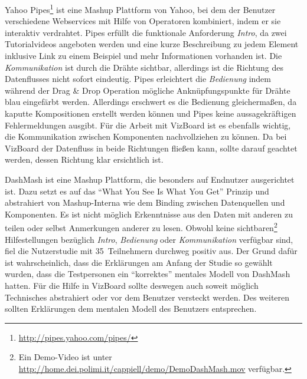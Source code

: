 \documentclass[
	headsepline,
	footsepline,
	fontsize=12pt,
	bibliography=totoc
]{scrbook}
\begin{document}
Yahoo Pipes\footnote{\url{http://pipes.yahoo.com/pipes/}} ist eine Mashup Plattform von Yahoo, bei dem der Benutzer verschiedene Webservices mit Hilfe von Operatoren kombiniert, indem er sie interaktiv verdrahtet.
Pipes erfüllt die funktionale Anforderung \emph{Intro}, da zwei Tutorialvideos angeboten werden und eine kurze Beschreibung zu jedem Element inklusive Link zu einem Beispiel und mehr Informationen vorhanden ist. Die \emph{Kommunikation} ist durch die Drähte sichtbar, allerdings ist die Richtung des Datenflusses nicht sofort eindeutig. Pipes erleichtert die \emph{Bedienung} indem während der Drag \& Drop Operation mögliche Anknüpfungspunkte für Drähte blau eingefärbt werden.
Allerdings erschwert es die Bedienung gleichermaßen, da kaputte Kompositionen erstellt werden können und Pipes keine aussagekräftigen Fehlermeldungen ausgibt.
Für die Arbeit mit VizBoard ist es ebenfalls wichtig, die Kommunikation zwischen Komponenten nachvollziehen zu können. Da bei VizBoard der Datenfluss in beide Richtungen fließen kann, sollte darauf geachtet werden, dessen Richtung klar ersichtlich ist.


DashMash \cite{Cappiello2011} ist eine Mashup Plattform, die besonders auf Endnutzer ausgerichtet ist. Dazu setzt es auf das \enquote{What You See Is What You Get} Prinzip und abstrahiert von Mashup-Interna wie dem Binding zwischen Datenquellen und Komponenten. Es ist nicht möglich Erkenntnisse aus den Daten mit anderen zu teilen oder selbst Anmerkungen anderer zu lesen. Obwohl keine sichtbaren\footnote{Ein Demo-Video ist unter \url{http://home.dei.polimi.it/cappiell/demo/DemoDashMash.mov} verfügbar.} Hilfestellungen bezüglich \emph{Intro}, \emph{Bedienung} oder \emph{Kommunikation} verfügbar sind, fiel die Nutzerstudie mit 35~Teilnehmern durchweg positiv aus. Der Grund dafür ist wahrscheinlich, dass die Erklärungen am Anfang der Studie so gewählt wurden, dass die Testpersonen ein \enquote{korrektes} mentales Modell von DashMash hatten. Für die Hilfe in VizBoard sollte deswegen auch soweit möglich Technisches abstrahiert oder vor dem Benutzer versteckt werden. Des weiteren sollten Erklärungen dem mentalen Modell des Benutzers entsprechen.

\end{document}
